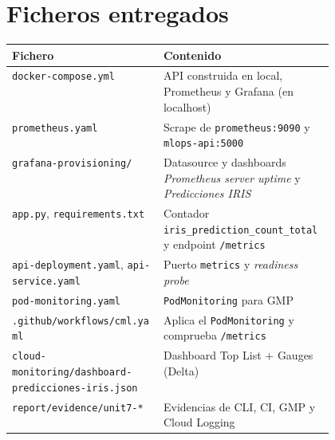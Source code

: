 \documentclass[11pt,a4paper]{article}
\newcommand{\code}[1]{\texttt{#1}}
\newcommand{\metrica}{\code{iris\_prediction\_count\_total}}
\begin{document}
\section*{Ficheros entregados}
\small
\begin{tabularx}{\linewidth}{@{}>{\raggedright\arraybackslash}p{0.47\linewidth}>{\raggedright\arraybackslash}X@{}}
\toprule
\textbf{Fichero} & \textbf{Contenido} \\
\midrule
\code{docker-compose.yml} & API construida en local, Prometheus y Grafana (en localhost) \\
\code{prometheus.yaml} & Scrape de \code{prometheus:9090} y \code{mlops-api:5000} \\
\code{grafana-provisioning/} & Datasource y dashboards \emph{Prometheus server uptime} y \emph{Predicciones IRIS} \\
\code{app.py}, \code{requirements.txt} & Contador \metrica{} y endpoint \code{/metrics} \\
\code{api-deployment.yaml}, \code{api-service.yaml} & Puerto \code{metrics} y \emph{readiness probe} \\
\code{pod-monitoring.yaml} & \code{PodMonitoring} para GMP \\
\code{.github/workflows/cml.yaml} & Aplica el \code{PodMonitoring} y comprueba \code{/metrics} \\
\code{cloud-monitoring/}\allowbreak\code{dashboard-predicciones-iris.json} & Dashboard Top List + Gauges (Delta) \\
\code{report/evidence/unit7-*} & Evidencias de CLI, CI, GMP y Cloud Logging \\
\bottomrule
\end{tabularx}
\end{document}

